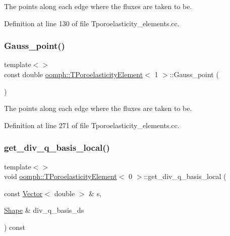 The points along each edge where the fluxes are taken to be. 



Definition at line 130 of file Tporoelasticity\+\_\+elements.\+cc.

\mbox{\label{classoomph_1_1TPoroelasticityElement_a7bbf908a66c7629f1dc17dea60046da5}} 
\subsubsection{\texorpdfstring{Gauss\+\_\+point()}{Gauss\_point()}\hspace{0.1cm}{\footnotesize\ttfamily [2/2]}}
{\footnotesize\ttfamily template$<$$>$ \\
const double \hyperlink{classoomph_1_1TPoroelasticityElement}{oomph\+::\+T\+Poroelasticity\+Element}$<$ 1 $>$\+::Gauss\+\_\+point (\begin{DoxyParamCaption}{ }\end{DoxyParamCaption})\hspace{0.3cm}{\ttfamily [private]}}



The points along each edge where the fluxes are taken to be. 



Definition at line 271 of file Tporoelasticity\+\_\+elements.\+cc.

\mbox{\label{classoomph_1_1TPoroelasticityElement_a4ab1a8528676f73f652109e16013467a}} 
\subsubsection{\texorpdfstring{get\+\_\+div\+\_\+q\+\_\+basis\+\_\+local()}{get\_div\_q\_basis\_local()}\hspace{0.1cm}{\footnotesize\ttfamily [1/3]}}
{\footnotesize\ttfamily template$<$$>$ \\
void \hyperlink{classoomph_1_1TPoroelasticityElement}{oomph\+::\+T\+Poroelasticity\+Element}$<$ 0 $>$\+::get\+\_\+div\+\_\+q\+\_\+basis\+\_\+local (\begin{DoxyParamCaption}\item[{const \hyperlink{classoomph_1_1Vector}{Vector}$<$ double $>$ \&}]{s,  }\item[{\hyperlink{classoomph_1_1Shape}{Shape} \&}]{div\+\_\+q\+\_\+basis\+\_\+ds }\end{DoxyParamCaption}) const\hspace{0.3cm}{\ttfamily [virtual]}}



